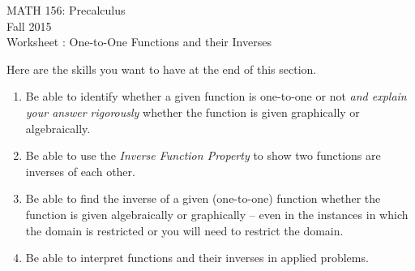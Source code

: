 \documentclass[11pt]{article}
\newcommand{\sect}{\textsection}
\begin{document}
 

\begin{center}MATH 156: Precalculus  \\ Fall 2015 \\ Worksheet \sect 2.8: One-to-One Functions and their Inverses\end{center}

\hrulefill

Here are the skills you want to have at the end of this section.
\begin{enumerate}
\item Be able to identify whether a given function is one-to-one or not {\emph{and explain your answer rigorously}} whether the function is given graphically or algebraically.
\item Be able to use the {\it{Inverse Function Property}} to show two functions are inverses of each other.
\item Be able to find the inverse of a given (one-to-one) function whether the function is given algebraically or graphically -- even in the instances in which the domain is restricted or you will need to restrict the domain.
\item Be able to interpret functions and their inverses in applied problems. 
\end{enumerate}

\hrulefill
\end{document}

